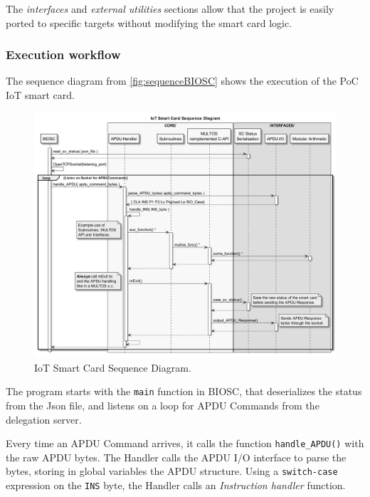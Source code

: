 \hfil

The \textit{interfaces} and \textit{external utilities} sections  allow that the project is easily ported to specific targets without modifying the smart card logic.



\subsubsection{Execution workflow}

The sequence diagram from \autoref{fig:sequenceBIOSC} shows the execution of the PoC IoT smart card.



\begin{figure}[bth]
	\begin{center}
		\includegraphics[width=\linewidth]{gfx/UML/sequenceBIOSC}
	\end{center}
	\caption{IoT Smart Card Sequence Diagram.}
	\label{fig:sequenceBIOSC}
\end{figure}



The program starts with the \texttt{main} function in BIOSC, that deserializes the status from the Json file, and listens on a loop for APDU Commands from the delegation server.

Every time an APDU Command arrives, it calls the function \texttt{handle\_APDU()} with the raw APDU bytes. The Handler calls the APDU I/O interface to parse the bytes, storing in global variables the APDU structure. Using a \texttt{switch-case} expression on the \texttt{INS} byte, the Handler calls an \textit{Instruction handler} function.

